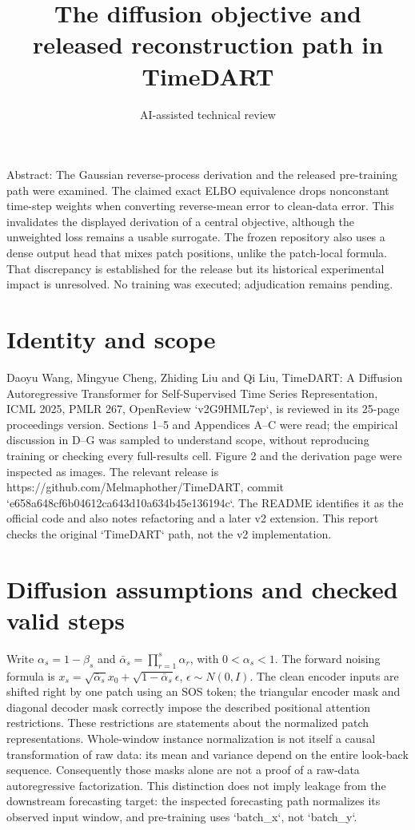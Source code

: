 \documentclass[10pt]{article}
\title{The diffusion objective and released reconstruction path in TimeDART}
\author{AI-assisted technical review}
\date{}
\begin{document}
\maketitle
Abstract: The Gaussian reverse-process derivation and the released pre-training path were examined. The claimed exact ELBO equivalence drops nonconstant time-step weights when converting reverse-mean error to clean-data error. This invalidates the displayed derivation of a central objective, although the unweighted loss remains a usable surrogate. The frozen repository also uses a dense output head that mixes patch positions, unlike the patch-local formula. That discrepancy is established for the release but its historical experimental impact is unresolved. No training was executed; adjudication remains pending.\par
\section*{Identity and scope}
Daoyu Wang, Mingyue Cheng, Zhiding Liu and Qi Liu, TimeDART: A Diffusion Autoregressive Transformer for Self-Supervised Time Series Representation, ICML 2025, PMLR 267, OpenReview `v2G9HML7ep`, is reviewed in its 25-page proceedings version. Sections 1–5 and Appendices A–C were read; the empirical discussion in D–G was sampled to understand scope, without reproducing training or checking every full-results cell. Figure 2 and the derivation page were inspected as images. The relevant release is https://github.com/Melmaphother/TimeDART, commit `e658a648cf6b04612ca643d10a634b45e136194c`. The README identifies it as the official code and also notes refactoring and a later v2 extension. This report checks the original `TimeDART` path, not the v2 implementation.\par
\section*{Diffusion assumptions and checked valid steps}
Write \(\alpha_s=1-\beta_s\) and \(\bar\alpha_s=\prod_{r=1}^s\alpha_r\), with \(0<\alpha_s<1\). The forward noising formula is \(x_s=\sqrt{\bar\alpha_s}x_0+\sqrt{1-\bar\alpha_s}\epsilon\), \(\epsilon\sim N(0,I)\). The clean encoder inputs are shifted right by one patch using an SOS token; the triangular encoder mask and diagonal decoder mask correctly impose the described positional attention restrictions. These restrictions are statements about the normalized patch representations. Whole-window instance normalization is not itself a causal transformation of raw data: its mean and variance depend on the entire look-back sequence. Consequently those masks alone are not a proof of a raw-data autoregressive factorization. This distinction does not imply leakage from the downstream forecasting target: the inspected forecasting path normalizes its observed input window, and pre-training uses `batch\_x`, not `batch\_y`.\par
\end{document}

